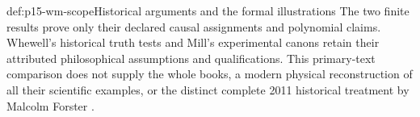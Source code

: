 \begin{proofboundary}{def:p15-wm-scope}{Historical arguments and the formal illustrations}
The two finite results prove only their declared causal assignments and
polynomial claims. Whewell's historical truth tests and Mill's experimental
canons retain their attributed philosophical assumptions and qualifications.
This primary-text comparison does not supply the whole books, a modern
physical reconstruction of all their scientific examples, or the distinct
complete 2011 historical treatment by Malcolm Forster
\parencite{Forster2011WhewellMill}.
\end{proofboundary}

